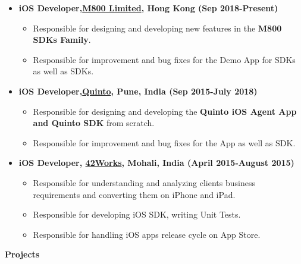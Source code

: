 \documentclass[letterpaper,11pt]{article}
\newcommand{\resitem}[1]{\item #1 \vspace{-2pt}}
\newcommand{\resheading}[1]{{\large \colorbox{mygrey}{\begin{minipage}{\textwidth}{\textbf{#1 \vphantom{p\^{E}}}}\end{minipage}}}}
\begin{document}
	\begin{itemize}
	\resitem {{\bfseries iOS Developer,\href{https://www.m800.com/} {M800 Limited}, Hong Kong (Sep 2018-Present)}}
				{ \footnotesize
				\begin{itemize}
					\resitem{Responsible for designing and developing new features in the {\bfseries M800 SDKs Family}.}
					\resitem{Responsible for improvement and bug fixes for the Demo App for SDKs as well as SDKs.}
				\end{itemize}
				}
	\resitem {{\bfseries iOS Developer,\href{http://quintoapp.com} {Quinto}, Pune, India (Sep 2015-July 2018)}}
				{ \footnotesize
				\begin{itemize}
					\resitem{Responsible for designing and developing the {\bfseries Quinto iOS Agent App and Quinto SDK} from scratch.}
					\resitem{Responsible for improvement and bug fixes for the App as well as SDK.}
				\end{itemize}
				}
	\resitem {{\bfseries iOS Developer, \href{http://42works.net/}{\bfseries 42Works}, Mohali, India (April 2015-August 2015)}}
				{ \footnotesize
				\begin{itemize}
					\resitem{Responsible for understanding and analyzing clients business requirements and converting them on iPhone and iPad.}
					\resitem{Responsible for developing iOS SDK, writing Unit Tests.}
					\resitem{Responsible for handling iOS apps release cycle on App Store.}
				\end{itemize}
				}
\end{itemize}  %
\vspace{5mm} 
\resheading{Projects}
\end{document}
